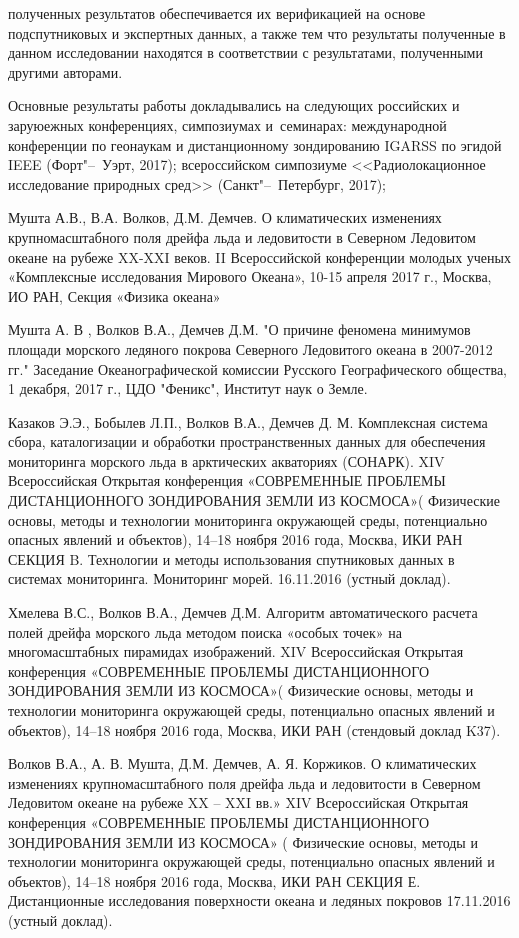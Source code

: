{\reliability} полученных результатов обеспечивается их верификацией на основе подспутниковых и экспертных данных, а также тем что результаты полученные в данном исследовании находятся в соответствии с результатами, полученными другими авторами. 

{\probation}
Основные результаты работы докладывались на следующих российских и заруюежных конференциях, симпозиумах и~семинарах: международной конференции по геонаукам и дистанционному зондированию IGARSS по эгидой IEEE (Форт"--~Уэрт, 2017); всероссийском симпозиуме <<Радиолокационное исследование природных сред>> (Санкт"--~Петербург, 2017);

Мушта А.В., В.А. Волков, Д.М. Демчев. О климатических изменениях крупномасштабного поля дрейфа льда и ледовитости в Северном Ледовитом океане на рубеже XX-XXI веков. II Всероссийской конференции молодых ученых «Комплексные исследования Мирового Океана», 10-15 апреля 2017 г., Москва, ИО РАН, Секция «Физика океана»

Мушта А. В , Волков В.А., Демчев Д.М. "О причине феномена минимумов площади морского ледяного покрова Северного Ледовитого океана в 2007-2012 гг."
Заседание Океанографической комиссии Русского Географического общества, 1 декабря, 2017 г., ЦДО "Феникс", Институт наук о Земле.

Казаков Э.Э., Бобылев Л.П., Волков В.А., Демчев Д. М. Комплексная система сбора, каталогизации и обработки пространственных данных для обеспечения мониторинга морского льда в арктических акваториях (СОНАРК).
XIV Всероссийская Открытая конференция «СОВРЕМЕННЫЕ ПРОБЛЕМЫ
ДИСТАНЦИОННОГО ЗОНДИРОВАНИЯ ЗЕМЛИ ИЗ КОСМОСА»( Физические основы, методы и технологии мониторинга окружающей среды, потенциально опасных явлений и объектов), 14–18 ноября 2016 года, Москва, ИКИ РАН
СЕКЦИЯ B. Технологии и методы использования спутниковых данных в системах мониторинга. Мониторинг морей. 16.11.2016 (устный доклад).

Хмелева В.С., Волков В.А., Демчев Д.М. Алгоритм автоматического расчета полей дрейфа морского льда методом поиска «особых точек» на многомасштабных пирамидах изображений.
XIV Всероссийская Открытая конференция «СОВРЕМЕННЫЕ ПРОБЛЕМЫ
ДИСТАНЦИОННОГО ЗОНДИРОВАНИЯ ЗЕМЛИ ИЗ КОСМОСА»( Физические основы, методы и технологии мониторинга окружающей среды, потенциально опасных явлений и объектов), 14–18 ноября 2016 года, Москва, ИКИ РАН
(стендовый доклад K37).

Волков В.А., А. В. Мушта, Д.М. Демчев, А. Я. Коржиков. О климатических изменениях крупномасштабного поля дрейфа льда и ледовитости в Северном Ледовитом океане на рубеже XX – XXI вв.»
XIV Всероссийская Открытая конференция «СОВРЕМЕННЫЕ ПРОБЛЕМЫ
ДИСТАНЦИОННОГО ЗОНДИРОВАНИЯ ЗЕМЛИ ИЗ КОСМОСА» ( Физические основы, методы и технологии мониторинга окружающей среды, потенциально опасных явлений и объектов), 14–18 ноября 2016 года, Москва, ИКИ РАН
СЕКЦИЯ Е. Дистанционные исследования поверхности океана
и ледяных покровов   17.11.2016 (устный доклад).

